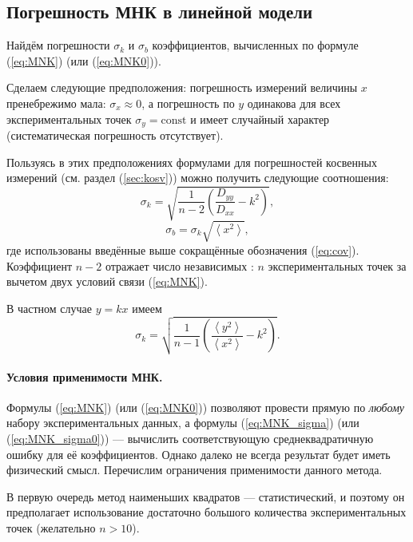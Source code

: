 \subsection{Погрешность МНК в линейной модели}

Найдём погрешности $\sigma_{k}$ и $\sigma_{b}$ коэффициентов, вычисленных
по формуле (\ref{eq:MNK}) (или (\ref{eq:MNK0})).

Сделаем следующие предположения: погрешность измерений величины $x$
пренебрежимо мала: $\sigma_{x}\approx0$, а погрешность по $y$ одинакова
для всех экспериментальных точек $\sigma_{y}=\mathrm{const}$ и имеет
случайный характер (систематическая погрешность отсутствует).

Пользуясь в этих предположениях формулами для погрешностей косвенных
измерений (см. раздел (\ref{sec:kosv})) можно получить следующие
соотношения:
\begin{equation}
    \label{eq:MNK_sigma}
    \sigma_{k}=\sqrt{\frac{1}{n-2}\left(\frac{D_{yy}}{D_{xx}}-k^{2}\right)},
\end{equation}
\begin{equation}
    \label{eq:MNK_sigma_b}
    \sigma_{b}=\sigma_{k}\sqrt{\left\langle x^{2}\right\rangle},
\end{equation}
где использованы введённые выше сокращённые обозначения (\ref{eq:cov}).
Коэффициент $n-2$ отражает число независимых : $n$ экспериментальных точек за вычетом двух
условий связи (\ref{eq:MNK}).

В частном случае $y=kx$ имеем
\begin{equation}
\sigma_{k}=\sqrt{\frac{1}{n-1}\left(\frac{\left\langle y^{2}\right\rangle
}{\left\langle x^{2}\right\rangle }-k^{2}\right)}.\label{eq:MNK_sigma0}
\end{equation}


\paragraph{Условия применимости МНК.}

Формулы (\ref{eq:MNK}) (или (\ref{eq:MNK0})) позволяют провести
прямую по \emph{любому} набору экспериментальных данных, а формулы
(\ref{eq:MNK_sigma}) (или (\ref{eq:MNK_sigma0})) --- вычислить
соответствующую среднеквадратичную ошибку для её коэффициентов. Однако
далеко не всегда результат будет иметь физический смысл. Перечислим
ограничения применимости данного метода.

В первую очередь метод наименьших квадратов --- статистический,
и поэтому он предполагает использование достаточно большого количества
экспериментальных точек (желательно $n>10$).

